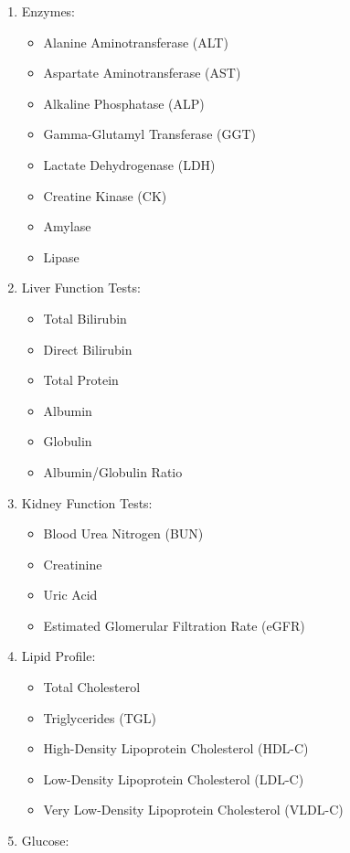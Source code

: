 \documentclass[
  11pt,
  letterpaper,
  DIV=11,
  numbers=noendperiod]{scrreprt}
\providecommand{\tightlist}{%
  \setlength{\itemsep}{0pt}\setlength{\parskip}{0pt}}\usepackage{longtable,booktabs,array}
\begin{document}
\begin{enumerate}
\def\labelenumi{\arabic{enumi}.}
\tightlist
\item
  Enzymes:

  \begin{itemize}
  \tightlist
  \item
    Alanine Aminotransferase (ALT)
  \item
    Aspartate Aminotransferase (AST)
  \item
    Alkaline Phosphatase (ALP)
  \item
    Gamma-Glutamyl Transferase (GGT)
  \item
    Lactate Dehydrogenase (LDH)
  \item
    Creatine Kinase (CK)
  \item
    Amylase
  \item
    Lipase
  \end{itemize}
\item
  Liver Function Tests:

  \begin{itemize}
  \tightlist
  \item
    Total Bilirubin
  \item
    Direct Bilirubin
  \item
    Total Protein
  \item
    Albumin
  \item
    Globulin
  \item
    Albumin/Globulin Ratio
  \end{itemize}
\item
  Kidney Function Tests:

  \begin{itemize}
  \tightlist
  \item
    Blood Urea Nitrogen (BUN)
  \item
    Creatinine
  \item
    Uric Acid
  \item
    Estimated Glomerular Filtration Rate (eGFR)
  \end{itemize}
\item
  Lipid Profile:

  \begin{itemize}
  \tightlist
  \item
    Total Cholesterol
  \item
    Triglycerides (TGL)
  \item
    High-Density Lipoprotein Cholesterol (HDL-C)
  \item
    Low-Density Lipoprotein Cholesterol (LDL-C)
  \item
    Very Low-Density Lipoprotein Cholesterol (VLDL-C)
  \end{itemize}
\item
  Glucose:


\end{enumerate}
\end{document}
